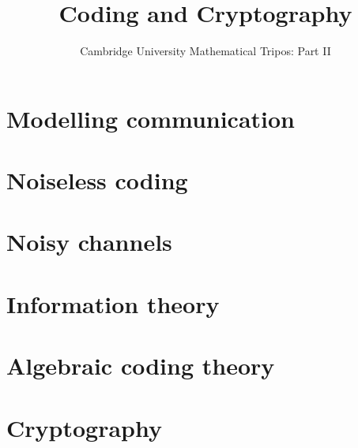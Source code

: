 \documentclass{article}
\title{Coding and Cryptography}
\author{Cambridge University Mathematical Tripos: Part II}
\begin{document}
\maketitle

\tableofcontentsnewpage{}

\section{Modelling communication}

\section{Noiseless coding}

\section{Noisy channels}

\section{Information theory}

\section{Algebraic coding theory}

\section{Cryptography}

\end{document}
